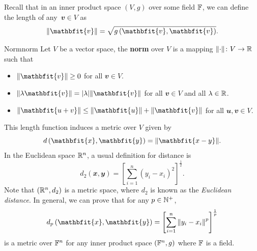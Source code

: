 \documentclass[math]{amznotes}
\theoremstyle{remark}
\begin{document}
Recall that in an inner product space $\left(V, g\right)$ over some field $\mathbb{F}$, we can define the length of any~$\mathbfit{v} \in V$ as 
\begin{equation*}
    \norm{\mathbfit{v}} = \sqrt{g\left(\mathbfit{v}, \mathbfit{v}\right)}.
\end{equation*}
\begin{dfnbox}{Norm}{norm}
    Let $V$ be a vector space, the {\color{red} \textbf{norm}} over $V$ is a mapping ${\left\lVert {\cdot} \right\rVert} \colon V \to \mathbb{R}$ such that 
    \begin{itemize}
        \item $\norm{\mathbfit{v}} \geq 0$ for all $\mathbfit{v} \in V$.
        \item $\norm{\lambda\mathbfit{v}} = \abs{\lambda}\norm{\mathbfit{v}}$ for all $\mathbfit{v} \in V$ and all $\lambda \in \mathbb{R}$.
        \item $\norm{\mathbfit{u + v}} \leq \norm{\mathbfit{u}} + \norm{\mathbfit{v}}$ for all $\mathbfit{u}, \mathbfit{v} \in V$.
    \end{itemize}
\end{dfnbox}
This length function induces a metric over $V$ given by 
\begin{equation*}
    d\left(\mathbfit{x}, \mathbfit{y}\right) = \norm{\mathbfit{x - y}}.
\end{equation*}
In the Euclidean space $\mathbb{R}^n$, a usual definition for distance is
\begin{equation*}
    d_2\left(\mathbfit{x}, \mathbfit{y}\right) = \left[\sum_{i = 1}^{n}\left(y_i - x_i\right)^2\right]^{\frac{1}{2}}.
\end{equation*}
Note that $\left(\mathbb{R}^n, d_2\right)$ is a metric space, where $d_2$ is known as the \textit{Euclidean distance}. In general, we can prove that for any $p \in \mathbb{N}^+$,
\begin{equation*}
    d_p\left(\mathbfit{x}, \mathbfit{y}\right) = \left[\sum_{i = 1}^{n}\norm{y_i - x_i}^p\right]^{\frac{1}{p}}
\end{equation*}
is a metric over $\mathbb{F}^n$ for any inner product space $\left(\mathbb{F}^n, g\right)$ where $\mathbb{F}$ is a field. 
\end{document}
